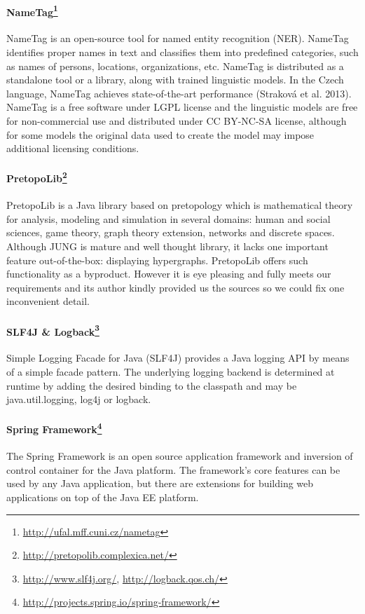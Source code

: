 \paragraph{NameTag\footnote{\url{http://ufal.mff.cuni.cz/nametag}}}
NameTag is an open-source tool for named entity recognition (NER). NameTag 
identifies proper names in text and classifies them into predefined categories,
such as names of persons, locations, organizations, etc. NameTag is distributed
as a standalone tool or a library, along with trained linguistic models.
In the Czech language, NameTag achieves state-of-the-art performance
(Straková et al. 2013). NameTag is a free software under LGPL license and the 
linguistic models are free for non-commercial use and distributed under CC 
BY-NC-SA license, although for some models the original data used to create
the model may impose additional licensing conditions.


\paragraph{PretopoLib\footnote{\url{http://pretopolib.complexica.net/}}}
PretopoLib is a Java library based on pretopology which is mathematical theory
for analysis, modeling and simulation in several domains: human and social
sciences, game theory, graph theory extension, networks and discrete spaces.
Although JUNG is mature and well thought library, it lacks one important feature
out-of-the-box: displaying hypergraphs. PretopoLib offers such functionality
as a byproduct. However it is eye pleasing and fully meets our requirements and
its author kindly provided us the sources so we could fix one inconvenient
detail.

\paragraph{SLF4J \& Logback\footnote{\url{http://www.slf4j.org/}, \url{http://logback.qos.ch/}}}
Simple Logging Facade for Java (SLF4J) provides a Java logging API by means
of a simple facade pattern. The underlying logging backend is determined
at runtime by adding the desired binding to the classpath and may be
java.util.logging, log4j or logback.

\paragraph{Spring Framework\footnote{\url{http://projects.spring.io/spring-framework/}}}
The Spring Framework is an open source application framework and inversion
of control container for the Java platform. The framework's core features
can be used by any Java application, but there are extensions for building
web applications on top of the Java EE platform.

